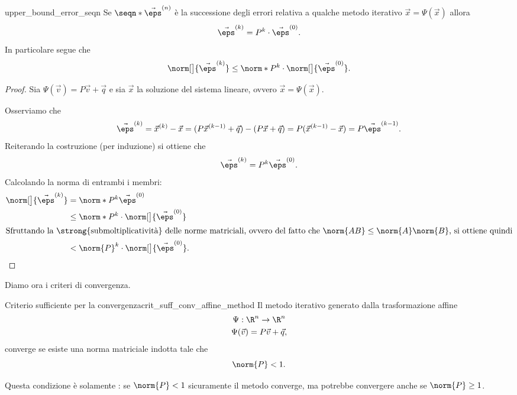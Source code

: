 \begin{lemma}{}{upper_bound_error_seqn}
    Se $\seqn*{\vec \eps^{(n)}}$ è la successione degli errori relativa a qualche metodo iterativo $\vec x = \Psi(\vec x)$ allora \[
        \vec \eps^{(k)} = P^k \cdot \vec \eps^{(0)}.
    \] In particolare segue che \[
        \norm[\big]{\vec \eps^{(k)}} \leq \norm*{P}^k \cdot \norm[\big]{\vec \eps^{(0)}}.
    \]
\end{lemma}
\begin{proof}
    Sia $\Psi(\vec v) = P\vec v + \vec q$ e sia $\vec x$ la soluzione del sistema lineare, ovvero $\vec x = \Psi(\vec x)$.
    
    Osserviamo che \[
        \vec \eps^{(k)} = \vec x^{(k)} - \vec x = (P\vec x^{(k-1)} + \vec q) - (P\vec x + \vec q) = P(\vec x^{(k-1)} - \vec x) = P\vec \eps^{(k-1)}.
    \] Reiterando la costruzione (per induzione) si ottiene che \[
        \vec \eps^{(k)} = P^k \vec \eps^{(0)}.
    \] Calcolando la norma di entrambi i membri: \begin{align*}
        \norm[\big]{\vec \eps^{(k)}} 
        &= \norm*{P^k \vec \eps^{(0)}} \\
        &\leq \norm*{P^k} \cdot \norm[\big]{\vec \eps^{(0)}}\\
        \intertext{Sfruttando la \strong{submoltiplicatività} delle norme matriciali, ovvero del fatto che $\norm{AB} \leq \norm{A}\norm{B}$, si ottiene quindi} 
        &< \norm{P}^k \cdot \norm[\big]{\vec \eps^{(0)}}. \qedhere
    \end{align*}
\end{proof}

Diamo ora i criteri di convergenza.

\begin{theorem}
    {Criterio sufficiente per la convergenza}{crit_suff_conv_affine_method}
    Il metodo iterativo generato dalla trasformazione affine \begin{gather*}
        \Psi : \R^n \to \R^n \\
        \Psi(\vec v) = P\vec v + \vec q,
    \end{gather*} converge se esiste una norma matriciale indotta tale che \[
        \norm{P} < 1.
    \]
\end{theorem}

\begin{remark}
    Questa condizione è solamente : se $\norm{P} < 1$ sicuramente il metodo converge, ma potrebbe convergere anche se $\norm{P} \geq 1$.  
\end{remark}

